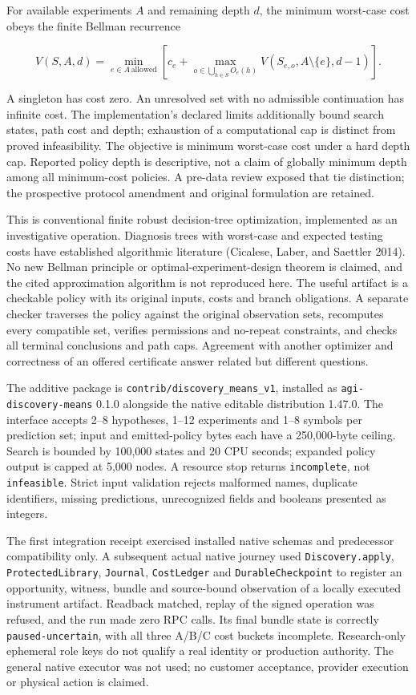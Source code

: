 \documentclass[10pt,letterpaper]{article}
\begin{document}
For available experiments \(A\) and remaining depth \(d\), the minimum
worst-case cost obeys the finite Bellman recurrence

\[V(S,A,d)=\min_{e\in A\,\text{allowed}}\left[c_e+\max_{o\in\bigcup_{h\in S}O_e(h)}V(S_{e,o},A\setminus\{e\},d-1)\right].\]

A singleton has cost zero. An unresolved set with no admissible
continuation has infinite cost. The implementation's declared limits
additionally bound search states, path cost and depth; exhaustion of a
computational cap is distinct from proved infeasibility. The objective
is minimum worst-case cost under a hard depth cap. Reported policy depth
is descriptive, not a claim of globally minimum depth among all
minimum-cost policies. A pre-data review exposed that tie distinction;
the prospective protocol amendment and original formulation are
retained.

This is conventional finite robust decision-tree optimization,
implemented as an investigative operation. Diagnosis trees with
worst-case and expected testing costs have established algorithmic
literature (Cicalese, Laber, and Saettler 2014). No new Bellman
principle or optimal-experiment-design theorem is claimed, and the cited
approximation algorithm is not reproduced here. The useful artifact is a
checkable policy with its original inputs, costs and branch obligations.
A separate checker traverses the policy against the original observation
sets, recomputes every compatible set, verifies permissions and
no-repeat constraints, and checks all terminal conclusions and path
caps. Agreement with another optimizer and correctness of an offered
certificate answer related but different questions.

The additive package is \texttt{contrib/discovery\_means\_v1}, installed
as \texttt{agi-discovery-means} 0.1.0 alongside the native editable
distribution 1.47.0. The interface accepts 2--8 hypotheses, 1--12
experiments and 1--8 symbols per prediction set; input and
emitted-policy bytes each have a 250,000-byte ceiling. Search is bounded
by 100,000 states and 20 CPU seconds; expanded policy output is capped
at 5,000 nodes. A resource stop returns \texttt{incomplete}, not
\texttt{infeasible}. Strict input validation rejects malformed names,
duplicate identifiers, missing predictions, unrecognized fields and
booleans presented as integers.

The first integration receipt exercised installed native schemas and
predecessor compatibility only. A subsequent actual native journey used
\texttt{Discovery.apply}, \texttt{ProtectedLibrary}, \texttt{Journal},
\texttt{CostLedger} and \texttt{DurableCheckpoint} to register an
opportunity, witness, bundle and source-bound observation of a locally
executed instrument artifact. Readback matched, replay of the signed
operation was refused, and the run made zero RPC calls. Its final bundle
state is correctly \texttt{paused-uncertain}, with all three A/B/C cost
buckets incomplete. Research-only ephemeral role keys do not qualify a
real identity or production authority. The general native executor was
not used; no customer acceptance, provider execution or physical action
is claimed.
\end{document}
